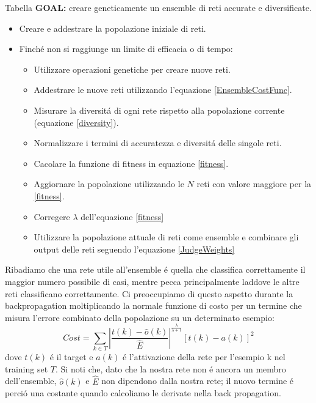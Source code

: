 \documentclass[a4paper,12pt]{report}
\begin{document}
  Tabella \textbf{GOAL:} creare geneticamente un ensemble di reti accurate e diversificate.
  \begin{itemize}
   \item Creare e addestrare la popolazione iniziale di reti.
   \item Finch\'e non si raggiunge un limite di efficacia o di tempo:
   \begin{itemize}
    \item Utilizzare operazioni genetiche per creare nuove reti.
    \item Addestrare le nuove reti utilizzando l'equazione \ref{EnsembleCostFunc}.
    \item Misurare la diversit\'a di ogni rete rispetto alla popolazione corrente (equazione \ref{diversity}).
    \item Normalizzare i termini di accuratezza e diversit\'a delle singole reti.
    \item Cacolare la funzione di fitness in equazione \ref{fitness}.
    \item Aggiornare la popolazione utilizzando le $N$ reti con valore maggiore per la \ref{fitness}.
    \item Corregere $\lambda$ dell'equazione \ref{fitness}
    \item Utilizzare la popolazione attuale di reti come ensemble e combinare gli output delle reti seguendo l'equazione \ref{JudgeWeights}
   \end{itemize}
  \end{itemize}
  Ribadiamo che una rete utile all'ensemble \'e quella che classifica correttamente il maggior numero possibile di casi, mentre pecca principalmente laddove le altre reti classificano correttamente. 
  Ci preoccupiamo di questo aspetto durante la backpropagation moltiplicando la normale funzione di costo per un termine che misura l'errore combinato della popolazione su un determinato esempio:
  \begin{equation}
   Cost = \sum_{k \in T} \left| \frac{t \left(k\right) - \widehat{o} \left(k\right)}{\widehat{E}} \right|^{\frac{\lambda}{\lambda + 1}} \left[ t\left(k\right) - a\left(k\right) \right]^2 \label{EnsembleCostFunc}
  \end{equation}
  dove $t(k)$ \'e il target e $a(k)$ \'e l'attivazione della rete per l'esempio k nel training set $T$. 
  Si noti che, dato che la nostra rete non \'e ancora un membro dell'ensemble, $\widehat{o} (k)$ e $\widehat{E}$ non dipendono dalla nostra rete; il nuovo termine \'e perci\'o una costante quando calcoliamo le derivate nella back propagation. 
\end{document}
